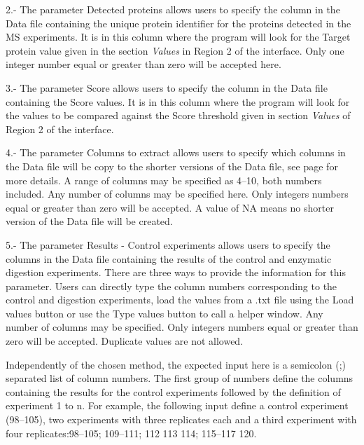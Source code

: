 \num{2}.- The parameter Detected proteins allows users to specify the column in the Data file containing the unique protein identifier for the proteins detected in the MS experiments. It is in this column where the program will look for the Target protein value given in the section \textit{Values} in Region \num{2} of the interface. Only one integer number equal or greater than zero will be accepted here.

\num{3}.- The parameter Score allows users to specify the column in the Data file containing the Score values. It is in this column where the program will look for the values to be compared against the Score threshold given in section \textit{Values} of Region \num{2} of the interface.

\num{4}.- The parameter Columns to extract\label{par:tarprotColExt} allows users to specify which columns in the Data file will be copy to the shorter versions of the Data file, see page \pageref{subsec:utilShortDF} for more details. A range of columns may be specified as \numrange[range-phrase = --]{4}{10}, both numbers included. Any number of columns may be specified here. Only integers numbers equal or greater than zero will be accepted. A value of NA means no shorter version of the Data file will be created.

\num{5}.- \label{par:tarprotResultControl}The parameter Results - Control experiments allows users to specify the columns in the Data file containing the results of the control and enzymatic digestion experiments. There are three ways to provide the information for this parameter. Users can directly type the column numbers corresponding to the control and digestion experiments, load the values from a .txt file using the Load values button or use the Type values button to call a helper window. Any number of columns may be specified. Only integers numbers equal or greater than zero will be accepted. Duplicate values are not allowed.

Independently of the chosen method, the expected input here is a semicolon (;) separated list of column numbers. The first group of numbers define the columns containing the results for the control experiments followed by the definition of experiment \num{1} to n. For example, the following input define a control experiment (\numrange[range-phrase = --]{98}{105}), two experiments with three replicates each and a third experiment with four replicates:\newline \numrange[range-phrase = --]{98}{105}; \numrange[range-phrase = --]{109}{111}; 112 113 114; \numrange[range-phrase = --]{115}{117} 120. 

